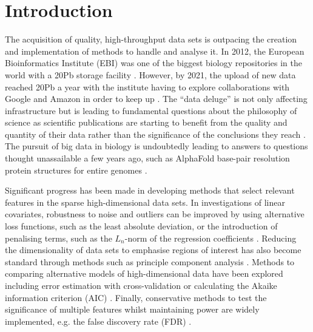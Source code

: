 \documentclass[../main.tex]{subfiles}
\begin{document}
\chapter{{Introduction}}

The acquisition of quality, high-throughput data sets is outpacing the creation and implementation of methods to handle and analyse it. 
In 2012, the European Bioinformatics Institute (EBI) was one of the biggest biology repositories in the world with a 20Pb storage facility \parencite{EBI2012}. 
However, by 2021, the upload of new data reached 20Pb a year with the institute having to explore collaborations with Google and Amazon in order to keep up \parencite{EBI2021}. 
The “data deluge” \parencite{Royal2012} is not only affecting infrastructure but is leading to fundamental questions about the philosophy of science as scientific publications are starting to benefit from the quality and quantity of their data rather than the significance of the conclusions they reach \parencite{Leonelli2019, Botstein2010}. 
The pursuit of big data in biology is undoubtedly leading to answers to questions thought unassailable a few years ago, such as AlphaFold base-pair resolution protein structures for entire genomes \parencite{Jumper2021}. 

Significant progress has been made in developing methods that select relevant features in the sparse high-dimensional data sets.
In investigations of linear covariates, robustness to noise and outliers can be improved by using alternative loss functions, such as the least absolute deviation, or the introduction of penalising terms, such as the $L_n$-norm of the regression coefficients \parencite{Wu2015}.
Reducing the dimensionality of data sets to emphasise regions of interest has also become standard through methods such as principle component analysis \parencite{Wall2005}.  
Methods to comparing alternative models of high-dimensional data have been explored including error estimation with cross-validation \parencite{Molinaro2005} or calculating the Akaike information criterion (AIC) \parencite{Akaike1998}.
Finally, conservative methods to test the significance of multiple features whilst maintaining power are widely implemented, e.g. the false discovery rate (FDR) \parencite{Benjamini1995}.
\end{document}
